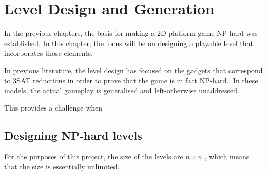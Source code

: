 \documentclass[11pt, a4paper, oneside]{report} %
\begin{document}




\chapter{Level Design and Generation}

In the previous chapters, the basis for making a 2D platform game NP-hard was
established. In this chapter, the focus will be on designing a playable level
that incorporates those elements.

In previous literature, the level design has focused on the gadgets that
correspond to 3SAT reductions in order to prove that the game is in
fact NP-hard.. In these models, the actual gameplay is
generalised and left-otherwise unaddressed.

This provides a challenge when

\section{Designing NP-hard levels}



For the purposes of this project, the size of the levels are $n\times n$ , which
means that the size is essentially unlimited.






\end{document}
